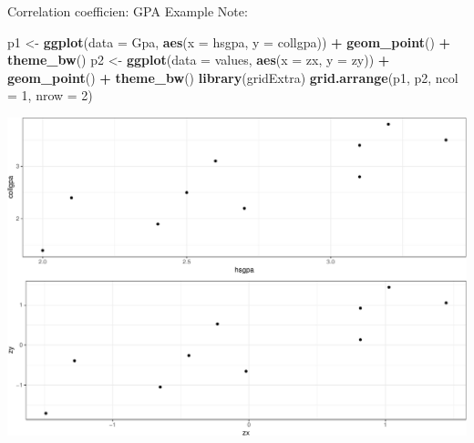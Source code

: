 \documentclass[
  ignorenonframetext,
]{beamer}
\newenvironment{Shaded}{\begin{snugshade}}{\end{snugshade}}
\newcommand{\AttributeTok}[1]{\textcolor[rgb]{0.13,0.29,0.53}{#1}}
\newcommand{\DecValTok}[1]{\textcolor[rgb]{0.00,0.00,0.81}{#1}}
\newcommand{\FunctionTok}[1]{\textcolor[rgb]{0.13,0.29,0.53}{\textbf{#1}}}
\newcommand{\NormalTok}[1]{#1}
\newcommand{\OtherTok}[1]{\textcolor[rgb]{0.56,0.35,0.01}{#1}}
\newcommand{\SpecialCharTok}[1]{\textcolor[rgb]{0.81,0.36,0.00}{\textbf{#1}}}
\begin{document}
\begin{frame}[fragile]{Correlation coefficien: GPA Example}
\protect\hypertarget{correlation-coefficien-gpa-example-4}{}
Note: \tiny

\begin{Shaded}
\begin{Highlighting}[]
\NormalTok{p1 }\OtherTok{\textless{}{-}} \FunctionTok{ggplot}\NormalTok{(}\AttributeTok{data =}\NormalTok{ Gpa, }\FunctionTok{aes}\NormalTok{(}\AttributeTok{x =}\NormalTok{ hsgpa, }\AttributeTok{y =}\NormalTok{ collgpa)) }\SpecialCharTok{+} 
  \FunctionTok{geom\_point}\NormalTok{() }\SpecialCharTok{+} 
  \FunctionTok{theme\_bw}\NormalTok{()}
\NormalTok{p2 }\OtherTok{\textless{}{-}} \FunctionTok{ggplot}\NormalTok{(}\AttributeTok{data =}\NormalTok{ values, }\FunctionTok{aes}\NormalTok{(}\AttributeTok{x =}\NormalTok{ zx, }\AttributeTok{y =}\NormalTok{ zy)) }\SpecialCharTok{+} 
  \FunctionTok{geom\_point}\NormalTok{() }\SpecialCharTok{+} 
  \FunctionTok{theme\_bw}\NormalTok{()}
\FunctionTok{library}\NormalTok{(gridExtra)}
\FunctionTok{grid.arrange}\NormalTok{(p1, p2, }\AttributeTok{ncol =} \DecValTok{1}\NormalTok{, }\AttributeTok{nrow =} \DecValTok{2}\NormalTok{)}
\end{Highlighting}
\end{Shaded}

\begin{center}\includegraphics[width=0.5\linewidth,height=0.5\textheight]{Week4_files/figure-beamer/unnamed-chunk-14-1} \end{center}
\normalsize
\end{frame}
\end{document}
